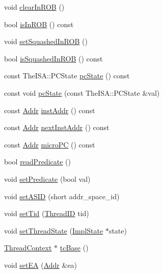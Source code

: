 \begin{DoxyCompactItemize}
\item 
void \hyperlink{classBaseDynInst_a41c8d6d7d42f2e72d1ffc2f1e731cae3}{clearInROB} ()
\item 
bool \hyperlink{classBaseDynInst_adc220257dd64e1af706d033eb74c9150}{isInROB} () const 
\item 
void \hyperlink{classBaseDynInst_a27471486b9fc6c5983f728e15c3dd6c9}{setSquashedInROB} ()
\item 
bool \hyperlink{classBaseDynInst_a3409062a85a322689611ea0f77b0532e}{isSquashedInROB} () const 
\item 
const TheISA::PCState \hyperlink{classBaseDynInst_a50cdfb6f4ba5ad01abb9ae5b777d7182}{pcState} () const 
\item 
const void \hyperlink{classBaseDynInst_af074e0233f7b4c7bb80ca26182833bf6}{pcState} (const TheISA::PCState \&val)
\item 
const \hyperlink{base_2types_8hh_af1bb03d6a4ee096394a6749f0a169232}{Addr} \hyperlink{classBaseDynInst_a85879d46d0c22de560215747a6d083af}{instAddr} () const 
\item 
const \hyperlink{base_2types_8hh_af1bb03d6a4ee096394a6749f0a169232}{Addr} \hyperlink{classBaseDynInst_ab8d2b7c268f277488b0f62e209e93f36}{nextInstAddr} () const 
\item 
const \hyperlink{base_2types_8hh_af1bb03d6a4ee096394a6749f0a169232}{Addr} \hyperlink{classBaseDynInst_a2a36b9c5ead1c8f50bde6b401d18b1b3}{microPC} () const 
\item 
bool \hyperlink{classBaseDynInst_a254cecc48d457ea298b08a8bb009f9cf}{readPredicate} ()
\item 
void \hyperlink{classBaseDynInst_a137a8c6cced89c2ff8387900439436b4}{setPredicate} (bool val)
\item 
void \hyperlink{classBaseDynInst_a0038e061ac1af4a45f8d301673483cd0}{setASID} (short addr\_\-space\_\-id)
\item 
void \hyperlink{classBaseDynInst_ad1c2ae5b668e7024fd2b0f956aefaa4e}{setTid} (\hyperlink{base_2types_8hh_ab39b1a4f9dad884694c7a74ed69e6a6b}{ThreadID} tid)
\item 
void \hyperlink{classBaseDynInst_a65bbd70cc4e254a52befad10cc6a6f9a}{setThreadState} (\hyperlink{classBaseDynInst_a767a9d57347239b1c904738bbd7796fa}{ImplState} $\ast$state)
\item 
\hyperlink{classThreadContext}{ThreadContext} $\ast$ \hyperlink{classBaseDynInst_ad33756f3e96ee445dca8d69b1dd8709c}{tcBase} ()
\item 
void \hyperlink{classBaseDynInst_addd147868ea9ed46b5c943b0eaa57544}{setEA} (\hyperlink{base_2types_8hh_af1bb03d6a4ee096394a6749f0a169232}{Addr} \&ea)

\end{DoxyCompactItemize}
